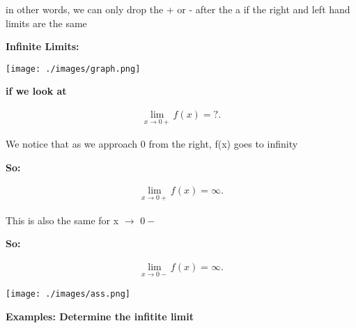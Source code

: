 \documentclass{report}
\begin{document}
    \bigbreak \noindent 
    in other words, we can only drop the + or - after the a if the right and left hand limits are the same

    \pagebreak
    \begin{large}
       \noindent \textbf{Infinite Limits:} 
    \end{large}
    
    \bigbreak \noindent \bigbreak 
    \begin{center}
        \texttt{[image: ./images/graph.png]}
    \end{center}
    
    \bigbreak \noindent 
    \textbf{if we look at }

    \begin{large}
        \begin{align*}
            \lim\limits_{x \to 0+}{f(x) = ?}
        .\end{align*}
    \end{large}
    
    \bigbreak \noindent 
    We notice that as we approach 0 from the right, f(x) goes to infinity

    \bigbreak \noindent 
    \textbf{So:}
    
    \begin{large}
        \begin{align*}
            \lim\limits_{x \to 0+}{f(x) = \infty}
        .\end{align*}
    \end{large}
    
    \bigbreak \noindent 
    This is also the same for x $\rightarrow$ $0-$
    
    \bigbreak \noindent 
    \textbf{So:}

    \begin{large}
        \begin{align*}
            \lim\limits_{x \to 0-}{f \left(x\right) = \infty}
        .\end{align*}
    \end{large}

    \bigbreak \noindent 

    \begin{center}
        \texttt{[image: ./images/ass.png]}
    \end{center}

    \bigbreak \noindent \bigbreak \noindent 
    \begin{large}
       \textbf{Examples: Determine the infitite limit} 
    \end{large}
\end{document}
